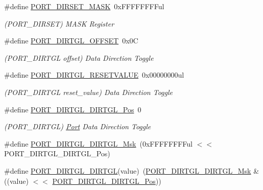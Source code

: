 \begin{DoxyCompactItemize}
\item 
\#define \mbox{\hyperlink{group___s_a_m_d21___p_o_r_t_gab1abf1381a08ea14af8f13dc141993e4}{P\+O\+R\+T\+\_\+\+D\+I\+R\+S\+E\+T\+\_\+\+M\+A\+SK}}~0x\+F\+F\+F\+F\+F\+F\+F\+Ful
\begin{DoxyCompactList}\small\item\em (P\+O\+R\+T\+\_\+\+D\+I\+R\+S\+ET) M\+A\+SK Register \end{DoxyCompactList}\item 
\#define \mbox{\hyperlink{group___s_a_m_d21___p_o_r_t_ga527f45d84e80e23f0545616308328337}{P\+O\+R\+T\+\_\+\+D\+I\+R\+T\+G\+L\+\_\+\+O\+F\+F\+S\+ET}}~0x0C
\begin{DoxyCompactList}\small\item\em (P\+O\+R\+T\+\_\+\+D\+I\+R\+T\+GL offset) Data Direction Toggle \end{DoxyCompactList}\item 
\#define \mbox{\hyperlink{group___s_a_m_d21___p_o_r_t_gabf69bb8e2dcdb2658c393352c4ab1451}{P\+O\+R\+T\+\_\+\+D\+I\+R\+T\+G\+L\+\_\+\+R\+E\+S\+E\+T\+V\+A\+L\+UE}}~0x00000000ul
\begin{DoxyCompactList}\small\item\em (P\+O\+R\+T\+\_\+\+D\+I\+R\+T\+GL reset\+\_\+value) Data Direction Toggle \end{DoxyCompactList}\item 
\#define \mbox{\hyperlink{group___s_a_m_d21___p_o_r_t_gae76952ebb5d27345861883e92a0b4580}{P\+O\+R\+T\+\_\+\+D\+I\+R\+T\+G\+L\+\_\+\+D\+I\+R\+T\+G\+L\+\_\+\+Pos}}~0
\begin{DoxyCompactList}\small\item\em (P\+O\+R\+T\+\_\+\+D\+I\+R\+T\+GL) \mbox{\hyperlink{struct_port}{Port}} Data Direction Toggle \end{DoxyCompactList}\item 
\#define \mbox{\hyperlink{group___s_a_m_d21___p_o_r_t_ga3f760de671e765111e9c760fdec994f5}{P\+O\+R\+T\+\_\+\+D\+I\+R\+T\+G\+L\+\_\+\+D\+I\+R\+T\+G\+L\+\_\+\+Msk}}~(0x\+F\+F\+F\+F\+F\+F\+F\+Ful $<$$<$ P\+O\+R\+T\+\_\+\+D\+I\+R\+T\+G\+L\+\_\+\+D\+I\+R\+T\+G\+L\+\_\+\+Pos)
\item 
\#define \mbox{\hyperlink{group___s_a_m_d21___p_o_r_t_gab6900b708762f7a3aaef111ac5929366}{P\+O\+R\+T\+\_\+\+D\+I\+R\+T\+G\+L\+\_\+\+D\+I\+R\+T\+GL}}(value)~(\mbox{\hyperlink{group___s_a_m_d21___p_o_r_t_ga3f760de671e765111e9c760fdec994f5}{P\+O\+R\+T\+\_\+\+D\+I\+R\+T\+G\+L\+\_\+\+D\+I\+R\+T\+G\+L\+\_\+\+Msk}} \& ((value) $<$$<$ \mbox{\hyperlink{group___s_a_m_d21___p_o_r_t_gae76952ebb5d27345861883e92a0b4580}{P\+O\+R\+T\+\_\+\+D\+I\+R\+T\+G\+L\+\_\+\+D\+I\+R\+T\+G\+L\+\_\+\+Pos}}))

\end{DoxyCompactItemize}

